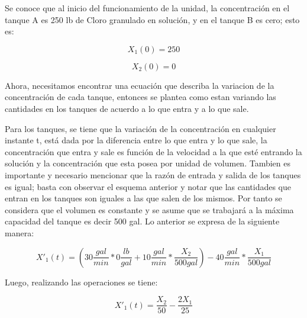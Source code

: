 \documentclass[titlepage]{article}
\begin{document}
            Se conoce que al inicio del funcionamiento de la unidad, la concentración en el tanque A es 250 lb de Cloro granulado en solución, y en el tanque B es cero; esto es:
            
                \begin{equation*}
                    X_1(0) = 250
                \end{equation*}
            
                \begin{equation*}
                    X_2(0) = 0
                \end{equation*}
            
            Ahora, necesitamos encontrar una ecuación que describa la variacion de la concentración de cada tanque, entonces se plantea como estan variando las cantidades en los tanques de acuerdo a lo que entra y a lo que sale.\vspace{0.1cm}
            
            Para los tanques, se tiene que la variación de la concentración en cualquier instante t, está dada por la diferencia entre lo que entra y lo que sale, la concentración que entra y sale es función de la velocidad a la que esté entrando la solución y la concentración que esta posea por unidad de volumen. Tambien es importante y necesario mencionar que la razón de entrada y salida de los tanques es igual; basta con observar el esquema anterior y notar que las cantidades que entran en los tanques son iguales a las que salen de los mismos. Por tanto se considera que el volumen es constante y se asume que se trabajará a la máxima capacidad del tanque es decir 500 gal. Lo anterior se expresa de la siguiente manera:
            
                \begin{equation*}
                    X'_1(t) = (30\frac{gal}{min}*0\frac{lb}{gal} + 10\frac{gal}{min}*\frac{X_2}{500gal}) - 40\frac{gal}{min}*\frac{X_1}{500gal}
                \end{equation*}\vspace{0.1cm}
                
            Luego, realizando las operaciones se tiene:
                
                \begin{equation}
                    X'_1(t) = \frac{X_2}{50} - \frac{2X_1}{25}
                    \label{X1}
                \end{equation}\vspace{0.1cm}    
                
\end{document}
